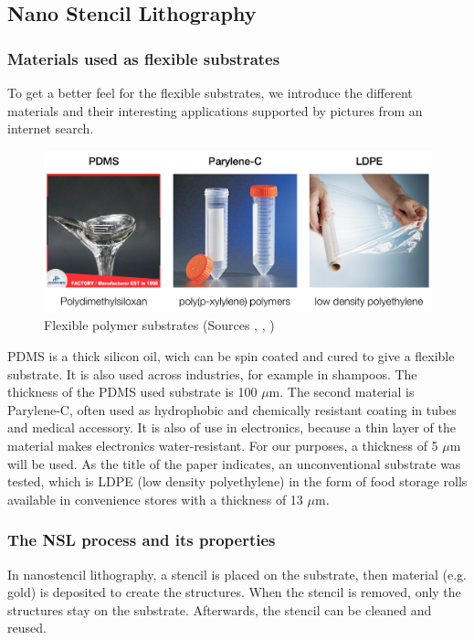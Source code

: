 \documentclass[journal, a4paper]{IEEEtran}
\begin{document}
\subsection{Nano Stencil Lithography}	

\subsubsection{Materials used as flexible substrates}
To get a better feel for the flexible substrates, we introduce the different materials and their interesting applications supported by pictures from an internet search.

\begin{figure}[hbt!]
\begin{center}
\includegraphics[width=\columnwidth]{03substrates.png}
\caption{Flexible polymer substrates (Sources \cite{PDMS}, \cite{Parylene-C}, \cite{LDPE})}
\label{fig:substrates}
\end{center}
\end{figure}

PDMS is a thick silicon oil, wich can be spin coated and cured to give a flexible substrate. It is also used across industries, for example in shampoos. The thickness of the PDMS used substrate is 100 $\mu$m. The second material is Parylene-C, often used as hydrophobic and chemically resistant coating in tubes and medical accessory. It is also of use in electronics, because a thin layer of the material makes electronics water-resistant. For our purposes, a thickness of 5 $\mu$m will be used. As the title of the paper indicates, an unconventional substrate was tested, which is LDPE (low density polyethylene) in the form of food storage rolls available in convenience stores with a thickness of 13 $\mu$m.

	
\subsubsection{The NSL process and its properties}
In nanostencil lithography, a stencil is placed on the substrate, then material (e.g. gold) is deposited to create the structures. When the stencil is removed, only the structures stay on the substrate. Afterwards, the stencil can be cleaned and reused.
\end{document}

